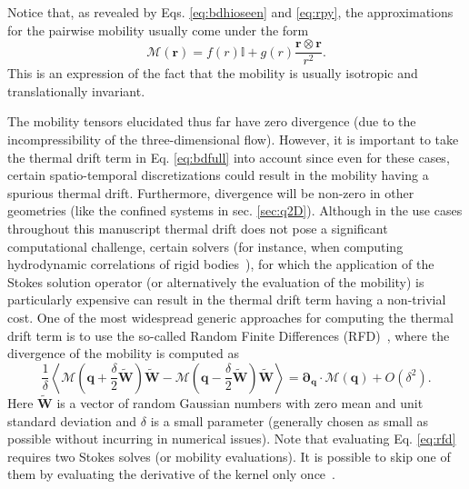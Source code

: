\documentclass[twoside,openright,titlepage,numbers=noenddot,%
headinclude,footinclude,cleardoublepage=empty,abstract=on,
BCOR=5mm,fontsize=11pt, dvipsnames, paper=b5
]{scrreprt}
\renewcommand{\vec}[1]{\bm{#1}}
\newcommand{\tens}[1]{\bm{\mathcal{#1}}}
\newcommand{\noise}{\widetilde{W}}
\newcommand{\ppos}{q}
\begin{document}
Notice that, as revealed by Eqs. \eqref{eq:bdhioseen} and \eqref{eq:rpy}, the approximations for the pairwise mobility usually come under the form
\begin{equation}
  \label{eq:bdhimobgeneral}
  \tens{M}(\vec{r}) = f(r)\mathbb{I} + g(r)\frac{\vec{r}\otimes\vec{r}}{r^2}.
\end{equation}
This is an expression of the fact that the mobility is usually isotropic and translationally invariant.

The mobility tensors elucidated thus far have zero divergence (due to the incompressibility of the three-dimensional flow). However, it is important to take the thermal drift term in Eq. \eqref{eq:bdfull} into account since even for these cases, certain spatio-temporal discretizations could result in the mobility having a spurious thermal drift. Furthermore, divergence will be non-zero in other geometries (like the confined systems in sec. \ref{sec:q2D}).
Although in the use cases throughout this manuscript thermal drift does not pose a significant computational challenge, certain solvers (for instance, when computing hydrodynamic correlations of rigid bodies~\cite{Westwood2021}), for which the application of the Stokes solution operator (or alternatively the evaluation of the mobility) is particularly expensive can result in the thermal drift term having a non-trivial cost.
One of the most widespread generic approaches for computing the thermal drift term is to use the so-called Random Finite Differences (RFD)~\cite{Delong2014}, where the divergence of the mobility is computed as
\begin{equation}
  \label{eq:rfd}
    \frac{1}{\delta}\left\langle \tens{M}\left(\vec{\ppos}+\frac{\delta}{2}\vec{\noise}\right)\vec{\noise} - \tens{M}\left(\vec{\ppos}-\frac{\delta}{2}\vec{\noise}\right)\vec{\noise}\right\rangle
    = \vec{\partial}_{\vec{\ppos}}\cdot\tens{M}(\vec{\ppos}) + O(\delta^2).
\end{equation}
Here $\vec{\noise}$ is a vector of random Gaussian numbers with zero mean and unit standard deviation and $\delta$ is a small parameter (generally chosen as small as possible without incurring in numerical issues).
Note that evaluating Eq. \eqref{eq:rfd} requires two Stokes solves (or mobility evaluations). It is possible to skip one of them by evaluating the derivative of the kernel only once~\cite{Delong2014}.
\end{document}
